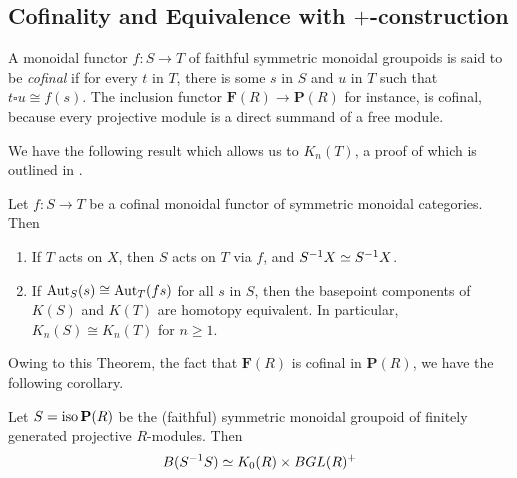\subsection{Cofinality and Equivalence with $+$-construction}

A monoidal functor $f : S \to T$ of faithful symmetric monoidal groupoids is said to be \emph{cofinal} if for
every $t$ in $T$, there is some $s$ in $S$ and $u$ in $T$ such that $t \square u \cong f(s)$.
The inclusion functor $\mathbf F(R) \to \mathbf P(R)$ for instance, is cofinal,
because every projective module is a direct summand of a free module.

We have the following result which allows us to $K_n(T)$, a proof of which is outlined in \cite{WeibelKbook}.

\begin{theorem}
Let $f : S \to T$ be a cofinal monoidal functor of symmetric monoidal categories. Then
\begin{enumerate}
  \item If $T$ acts on $X$, then $S$ acts on $T$ via $f$, and $S^{-1}X \simeq S^{-1}X$.
  \item If $\operatorname*{Aut}_S(s) \cong \operatorname*{Aut}_T(fs)$ for all $s$ in $S$, then the basepoint components
  of $K(S)$ and $K(T)$ are homotopy equivalent.
  In particular, $K_n(S) \cong K_n(T)$ for $n \geq 1$.
\end{enumerate}
\end{theorem}
%

Owing to this Theorem, the fact that $\mathbf F(R)$ is cofinal in $\mathbf P(R)$,
we have the following corollary.

\begin{corollary}
Let $S = \operatorname*{iso} \mathbf P(R)$ be the (faithful) symmetric monoidal groupoid of finitely generated
projective $R$-modules. Then
\begin{equation}
B(S^{-1}S) \simeq K_0(R) \times BGL(R)^+
  \label{eq:Sequals+}
\end{equation}
\end{corollary}

%

